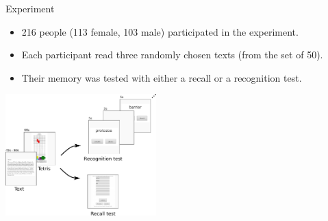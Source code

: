 \documentclass[10pt,ignorenonframetext,]{beamer}
\providecommand{\tightlist}{%
  \setlength{\itemsep}{0pt}\setlength{\parskip}{0pt}}
\begin{document}
\begin{frame}{Experiment}
\protect\hypertarget{experiment}{}

\begin{itemize}
\tightlist
\item
  216 people (113 female, 103 male) participated in the experiment.
\item
  Each participant read three randomly chosen texts (from the set of
  50).
\item
  Their memory was tested with either a recall or a recognition test.
\end{itemize}

\begin{center}\includegraphics[width=220px]{task_diagram} \end{center}

\end{frame}
\end{document}
